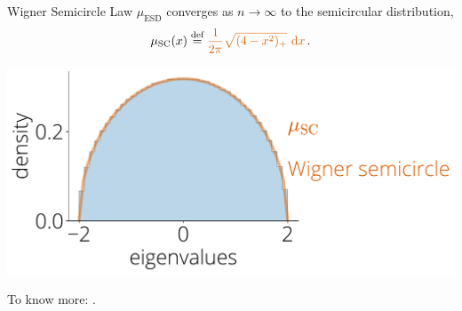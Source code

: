\documentclass[10pt, aspectratio=169]{beamer}
\begin{document}
\begin{frame}{Wigner Semicircle Law}
$\mu_{\text{ESD}}$  converges as $n \to \infty$ to the semicircular distribution, 
  \[ \mu_{\text{SC}}(x) \defas {\color{myorange}\frac{1}{2\pi} \sqrt{(4-x^2)_+} \, \dif x}\,.  \]

\centering\includegraphics[width=0.6\linewidth]{part-1-images/wigner_semicircle.pdf}

{\footnotesize To know more: \citep{tao2012topics, bai2010spectral}.}



\end{frame}
\end{document}
